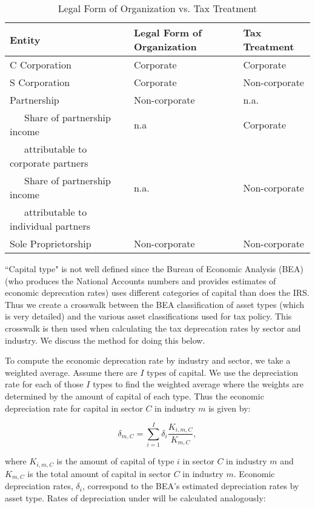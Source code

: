 \documentclass[article,11pt,letterpaper,fleqn]{article}
\theoremstyle{definition}
\numberwithin{equation}{section}
\begin{document}
\begin{table}[htbp]
  \centering
  \caption{Legal Form of Organization vs. Tax Treatment}
    \begin{tabular}{lll}
    \hline
    \hline
    Entity & Legal Form of Organization & Tax Treatment \\
   \hline
    C Corporation & Corporate & Corporate \\
    S Corporation & Corporate & Non-corporate \\
    Partnership & Non-corporate & n.a. \\
    \ \ \ Share of partnership income & n.a   & Corporate \\
    \ \ \ attributable to corporate partners & &  \\
    \ \ \ Share of partnership income& n.a.  & Non-corporate \\
    \ \ \ attributable to individual partners &  &  \\
    Sole Proprietorship & Non-corporate & Non-corporate \\
    \hline
    \hline
    \end{tabular}%
  \label{tab:org_form}%
\end{table}%


``Capital type" is not well defined since the Bureau of Economic Analysis (BEA) (who produces the National Accounts numbers and provides estimates of economic deprecation rates) uses different categories of capital than does the IRS.  Thus we create a crosswalk between the BEA classification of asset types (which is very detailed) and the various asset classifications used for tax policy.  This crosswalk is then used when calculating the tax deprecation rates by sector and industry.  We discuss the method for doing this below.

To compute the economic deprecation rate by industry and sector, we take a weighted average.  Assume there are $I$ types of capital.  We use the depreciation rate for each of those $I$ types to find the weighted average where the weights are determined by the amount of capital of each type.  Thus the economic depreciation rate for capital in sector $C$ in industry $m$ is given by:

\begin{equation}
\label{eqn:econ_deprec}
\delta_{m,C}=\sum_{i=1}^{I}\delta_{i}\frac{K_{i,m,C}}{K_{m,C}},
\end{equation}

\noindent\noindent where $K_{i,m,C}$ is the amount of capital of type $i$ in sector $C$ in industry $m$ and $K_{m,C}$ is the total amount of capital in sector $C$ in industry $m$.  Economic depreciation rates, $\delta_{i}$, correspond to the BEA's estimated depreciation rates by asset type.  Rates of depreciation under will be calculated analogously: 
\end{document}
